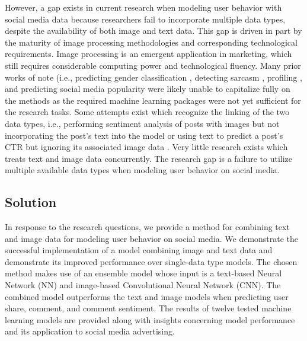 \documentclass[mksc,blindrev]{informs3} %
\begin{document}
However, a gap exists in current research when modeling user behavior with social media data because researchers fail to incorporate multiple data types, despite the availability of both image and text data. This gap is driven in part by the maturity of image processing methodologies and corresponding technological requirements. Image processing is an emergent application in marketing, which still requires considerable computing power and technological fluency. Many prior works of note (i.e., predicting gender classification \cite{Hassner2015}, detecting sarcasm \cite{Poria2016}, profiling \cite{Segalin2017}, and predicting social media popularity \cite{Gelli2015} were likely unable to capitalize fully on the methods as the required machine learning packages were not yet sufficient for the research tasks. Some attempts exist which recognize the linking of the two data types, i.e., performing sentiment analysis of posts with images \cite{Wang2015} but not incorporating the post’s text into the model or using text to predict a post’s CTR but ignoring its associated image data \cite{Li2015}. Very little research exists which treats text and image data concurrently. The research gap is a failure to utilize multiple available data types when modeling user behavior on social media.

\subsection{Solution}

In response to the research questions, we provide a method for combining text and image data for modeling user behavior on social media. We demonstrate the successful implementation of a model combining image and text data and demonstrate its improved performance over single-data type models. The chosen method makes use of an ensemble model whose input is a text-based Neural Network (NN) and image-based Convolutional Neural Network (CNN). The combined model outperforms the text and image models when predicting user share, comment, and comment sentiment. The results of twelve tested machine learning models are provided along with insights concerning model performance and its application to social media advertising. 
\end{document}
